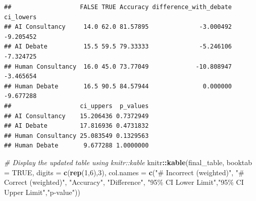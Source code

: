 \documentclass[
]{article}
\newenvironment{Shaded}{\begin{snugshade}}{\end{snugshade}}
\newcommand{\AttributeTok}[1]{\textcolor[rgb]{0.13,0.29,0.53}{#1}}
\newcommand{\CommentTok}[1]{\textcolor[rgb]{0.56,0.35,0.01}{\textit{#1}}}
\newcommand{\ConstantTok}[1]{\textcolor[rgb]{0.56,0.35,0.01}{#1}}
\newcommand{\DecValTok}[1]{\textcolor[rgb]{0.00,0.00,0.81}{#1}}
\newcommand{\FunctionTok}[1]{\textcolor[rgb]{0.13,0.29,0.53}{\textbf{#1}}}
\newcommand{\NormalTok}[1]{#1}
\newcommand{\OtherTok}[1]{\textcolor[rgb]{0.56,0.35,0.01}{#1}}
\newcommand{\SpecialCharTok}[1]{\textcolor[rgb]{0.81,0.36,0.00}{\textbf{#1}}}
\newcommand{\StringTok}[1]{\textcolor[rgb]{0.31,0.60,0.02}{#1}}
\begin{document}
\begin{Shaded}
\end{Shaded}

\begin{verbatim}
##                   FALSE TRUE Accuracy difference_with_debate ci_lowers
## AI Consultancy     14.0 62.0 81.57895              -3.000492 -9.205452
## AI Debate          15.5 59.5 79.33333              -5.246106 -7.324725
## Human Consultancy  16.0 45.0 73.77049             -10.808947 -3.465654
## Human Debate       16.5 90.5 84.57944               0.000000 -9.677288
##                   ci_uppers  p_values
## AI Consultancy    15.206436 0.7372949
## AI Debate         17.816936 0.4731832
## Human Consultancy 25.083549 0.1329563
## Human Debate       9.677288 1.0000000
\end{verbatim}

\begin{Shaded}
\begin{Highlighting}[]
\CommentTok{\# Display the updated table using knitr::kable}
\NormalTok{knitr}\SpecialCharTok{::}\FunctionTok{kable}\NormalTok{(final\_table, }\AttributeTok{booktab =} \ConstantTok{TRUE}\NormalTok{,  }\AttributeTok{digits =} \FunctionTok{c}\NormalTok{(}\FunctionTok{rep}\NormalTok{(}\DecValTok{1}\NormalTok{,}\DecValTok{6}\NormalTok{),}\DecValTok{3}\NormalTok{),}
             \AttributeTok{col.names =} \FunctionTok{c}\NormalTok{(}\StringTok{"\# Incorrect (weighted)"}\NormalTok{, }\StringTok{"\# Correct (weighted)"}\NormalTok{, }\StringTok{"Accuracy"}\NormalTok{, }\StringTok{"Difference"}\NormalTok{, }\StringTok{"95\% CI Lower Limit"}\NormalTok{,}\StringTok{"95\% CI Upper Limit"}\NormalTok{,}\StringTok{"p{-}value"}\NormalTok{))}
\end{Highlighting}
\end{Shaded}
\end{document}
